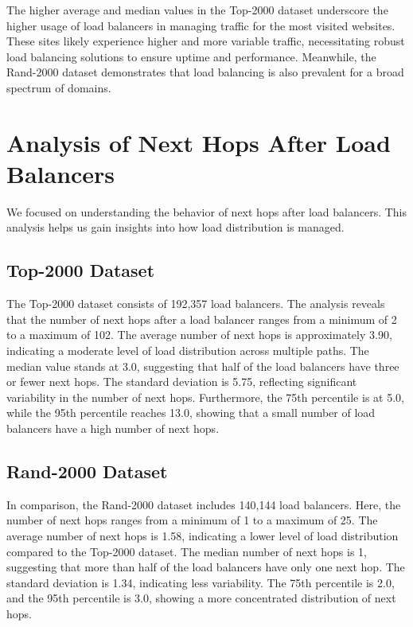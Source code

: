 \documentclass[12pt]{cwru_thesis}
\begin{document}
The higher average and median values in the Top-2000 dataset underscore the higher usage of load balancers in managing traffic for the most visited websites. These sites likely experience higher and more variable traffic, necessitating robust load balancing solutions to ensure uptime and performance. Meanwhile, the Rand-2000 dataset demonstrates that load balancing is also prevalent for a broad spectrum of domains.

\section{Analysis of Next Hops After Load Balancers}

We focused on understanding the behavior of next hops after load balancers. This analysis helps us gain insights into how load distribution is managed.

\subsection{Top-2000 Dataset}

The Top-2000 dataset consists of 192,357 load balancers. The analysis reveals that the number of next hops after a load balancer ranges from a minimum of 2 to a maximum of 102. The average number of next hops is approximately 3.90, indicating a moderate level of load distribution across multiple paths. The median value stands at 3.0, suggesting that half of the load balancers have three or fewer next hops. The standard deviation is 5.75, reflecting significant variability in the number of next hops. Furthermore, the 75th percentile is at 5.0, while the 95th percentile reaches 13.0, showing that a small number of load balancers have a high number of next hops.

\subsection{Rand-2000 Dataset}

In comparison, the Rand-2000 dataset includes 140,144 load balancers. Here, the number of next hops ranges from a minimum of 1 to a maximum of 25. The average number of next hops is 1.58, indicating a lower level of load distribution compared to the Top-2000 dataset. The median number of next hops is 1, suggesting that more than half of the load balancers have only one next hop. The standard deviation is 1.34, indicating less variability. The 75th percentile is 2.0, and the 95th percentile is 3.0, showing a more concentrated distribution of next hops.
\end{document}
